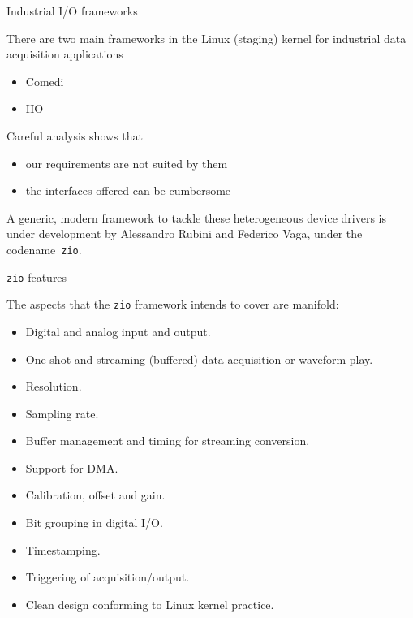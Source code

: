 \documentclass{beamer}
\begin{document}
\begin{frame}{Industrial I/O frameworks}

There are two main frameworks in the Linux (staging) kernel for
industrial data acquisition applications
\begin{itemize}
\item Comedi
\item IIO
\end{itemize}

Careful analysis shows that
\begin{itemize}
\item our requirements are not suited by them
\item the interfaces offered can be cumbersome
\end{itemize}

A generic, modern framework to tackle these heterogeneous device drivers
is under development by Alessandro Rubini and Federico Vaga, under the
codename~\texttt{zio}.

\end{frame}

\begin{frame}{\texttt{zio} features}

The aspects that the \texttt{zio} framework intends to cover are
manifold:
\begin{itemize}
\item Digital and analog input and output.
\item One-shot and streaming (buffered) data acquisition or waveform play.
\item Resolution.
\item Sampling rate.
\item Buffer management and timing for streaming conversion.
\item Support for DMA.
\item Calibration, offset and gain.
\item Bit grouping in digital I/O.
\item Timestamping.
\item Triggering of acquisition/output.
\item Clean design conforming to Linux kernel practice.
\end{itemize}

\end{frame}
\end{document}
